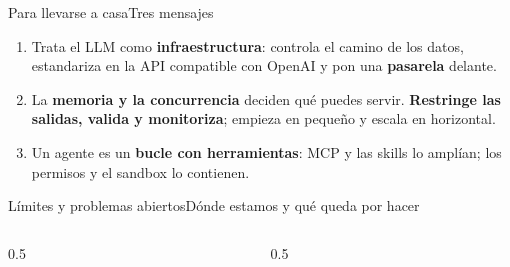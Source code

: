 
\begin{frame}{Para llevarse a casa}{Tres mensajes}
  \begin{enumerate}
    \item Trata el LLM como \textbf{infraestructura}: controla el camino de los datos, estandariza en la API compatible con OpenAI y pon una \textbf{pasarela} delante.
    \item La \textbf{memoria y la concurrencia} deciden qué puedes servir. \textbf{Restringe las salidas, valida y monitoriza}; empieza en pequeño y escala en horizontal.
    \item Un agente es un \textbf{bucle con herramientas}: MCP y las skills lo amplían; los permisos y el sandbox lo contienen.
  \end{enumerate}
\end{frame}

\begin{frame}{Límites y problemas abiertos}{Dónde estamos y qué queda por hacer}
  \begin{columns}[T]
    \begin{column}{0.5\textwidth}
    \end{column}
    \begin{column}{0.5\textwidth}
    \end{column}
  \end{columns}
\end{frame}

